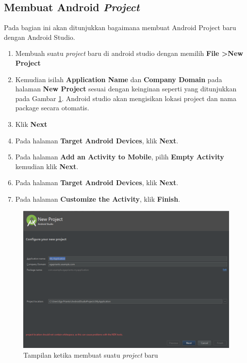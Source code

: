 \subsection{Membuat Android \textit{Project}}
Pada bagian ini akan ditunjukkan bagaimana membuat Android Project baru dengan Android Studio.
\begin{enumerate}
	\item Membuah suatu \textit{project} baru di android studio dengan memilih \textbf{File \textgreater New Project}
	\item Kemudian isilah \textbf{Application Name} dan \textbf{Company Domain} pada halaman \textbf{New Project} sesuai dengan keinginan seperti yang ditunjukkan pada Gambar \ref{fig:android-studio-create-new-project}.
	Android studio akan mengisikan lokasi project dan nama package secara otomatis. 
	\item Klik \textbf{Next}
	\item Pada halaman \textbf{Target Android Devices}, klik \textbf{Next}.
	\item Pada halaman \textbf{Add an Activity to Mobile}, pilih \textbf{Empty Activity} kemudian klik \textbf{Next}.
	\item Pada halaman \textbf{Target Android Devices}, klik \textbf{Next}.
	\item Pada halaman \textbf{Customize the Activity}, klik \textbf{Finish}.
\end{enumerate}
\begin{figure}[htbp]
	\centering
		\includegraphics[scale=0.56]{Gambar/android-studio-create-new-project.png}
	\caption{Tampilan ketika membuat suatu \textit{project} baru}
	\label{fig:android-studio-create-new-project}
\end{figure}

